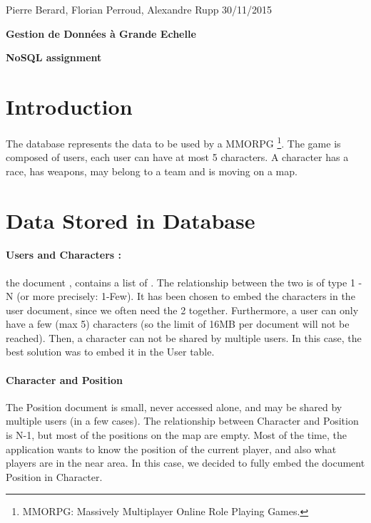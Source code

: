 \documentclass[a4paper, 11pt]{article}
\begin{document}
\noindent
Pierre Berard, Florian Perroud, Alexandre Rupp  \hfill 30/11/2015 
\vspace{-0.3cm}\\

{\LARGE 
\begin{center}
\textbf{Gestion de Données à Grande Echelle} \\
\vspace{0.2cm}
\end{center}
}
\begin{center}
\textbf{NoSQL assignment} \\
\end{center}



\section{Introduction}
The database represents the data to be used by a MMORPG \footnote{MMORPG: Massively Multiplayer Online Role Playing Games.}.
The game is composed of users, each user can have at most 5 characters. A character has a race, has weapons, may belong to a team and is moving on a map.

\section{Data Stored in Database}

\paragraph{Users and Characters :} the document , contains a list of . The relationship between the two is of type 1 - N (or more precisely: 1-Few). It has been chosen to embed the characters in the user document, since we often need the 2 together. Furthermore, a user can only have a few (max 5) characters (so the limit of 16MB per document will not be reached). Then, a character can not be shared by multiple users. In this case, the best solution was to embed it in the User table.

\paragraph{Character and Position\\}
The Position document is small, never accessed alone, and may be shared by multiple users (in a few cases). The relationship between Character and Position is N-1, but most of the positions on the map are empty. Most of the time, the application wants to know the position of the current player, and also what players are in the near area. In this case, we decided to fully embed the document Position in Character.
\end{document}
